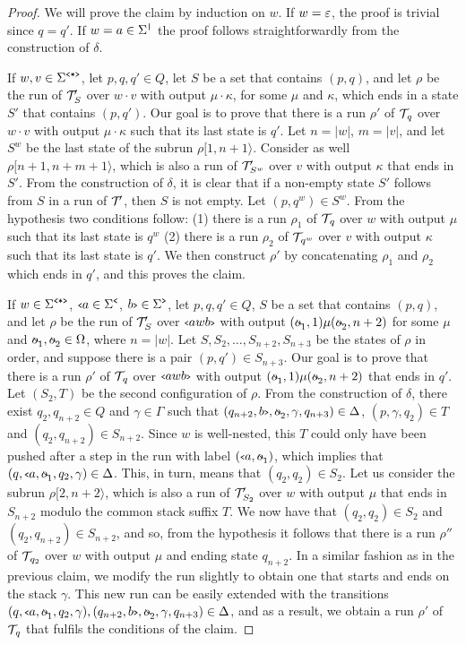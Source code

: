 	\begin{proof}
		We will prove the claim by induction on $w$.
		If $w = \varepsilon$, the proof is trivial since $q = q'$. If $w = a\in\Sigma^{\texttt{|}}$ the proof follows straightforwardly from the construction of $\delta$.
		
		If $w,v\in\Sigma^{\texttt{<*>}}$, let $p,q,q'\in Q$, let $S$ be a set that contains $(p,q)$, and let $\rho$ be the run of $\mathcal{T}\!'_S$ over $w\cdot v$ with output $\mu\cdot \kappa$, for some $\mu$ and $\kappa$, which ends in a state $S'$ that contains $(p,q')$. 
		Our goal is to prove that there is a run $\rho'$ of $\mathcal{T}\!_q$ over $w\cdot v$ with output $\mu\cdot\kappa$ such that its last state is $q'$.
		Let $n = \vert w\vert$, $m = \vert v \vert$, and let $S^w$ be the last state of the subrun $\rho[1,n+1\rangle$. 
		Consider as well $\rho[n+1,n+m+1\rangle$, which is also a run of $\mathcal{T}\!'_{S^w}$ over $v$ with output $\kappa$ that ends in $S'$.
		From the construction of $\delta$, it is clear that if a non-empty state $S'$ follows from $S$ in a run of $\mathcal{T}\!'$, then $S$ is not empty.
		Let $(p,q^w)\in S^w$.
		From the hypothesis two conditions follow: 
		(1) there is a run $\rho_1$ of $\mathcal{T}\!_q$ over $w$ with output $\mu$ such that its last state is $q^w$
		(2) there is a run $\rho_2$ of $\mathcal{T}\!_{q^w}$ over $v$ with output $\kappa$ such that its last state is $q'$. 
		We then construct $\rho'$ by concatenating $\rho_1$ and $\rho_2$ which ends in $q'$, and this proves the claim.
		
		If $w\in\Sigma^{\texttt{<*>}}$, ${\scriptsize\texttt{<}} a\in\Sigma^{\texttt{<}}$, $b{\scriptsize\texttt{>}}\in\Sigma^{\texttt{>}}$, let $p,q,q'\in Q$, $S$ be a set that contains $(p,q)$, and let $\rho$ be the run of $\mathcal{T}\!'_S$ over ${\scriptsize\texttt{<}} awb{\scriptsize\texttt{>}}$ with output $(\oout_1, 1)\mu(\oout_2, n+2)$ for some $\mu$ and $\oout_1,\oout_2\in\oalph$, where $n = |w|$. 
		Let $S, S_2, \ldots, S_{n+2}, S_{n+3}$ be the states of $\rho$ in order, and suppose there is a pair $(p,q')\in S_{n+3}$.
		Our goal is to prove that there is a run $\rho'$ of $\mathcal{T}\!_q$ over ${\scriptsize\texttt{<}} awb{\scriptsize\texttt{>}}$ with output $(\oout_1, 1)\mu(\oout_2, n+2)$ that ends in $q'$. 
		Let $(S_2,T)$ be the second configuration of $\rho$.
		From the construction of $\delta$, there exist $q_2,q_{n+2}\in Q$ and $\gamma\in\Gamma$ such that $(q_{n+2},\cl{b},\oout_2,\gamma,q_{n+3})\in\Delta$, $(p,\gamma,q_2)\in T$ and $(q_2,q_{n+2})\in S_{n+2}$.
		Since $w$ is well-nested, this $T$ could only have been pushed after a step in the run with label $(\op{a},\oout_1)$, which implies that $(q,\op{a},\oout_1,q_2,\gamma)\in\Delta$. This, in turn, means that $(q_2,q_2)\in S_2$.
		Let us consider the subrun $\rho[2,n+2\rangle$, which is also a run of $\mathcal{T}\!'_{S_2}$ over $w$ with output $\mu$ that ends in $S_{n+2}$ modulo the common stack suffix $T$.
		We now have that $(q_2,q_2)\in S_2$ and $(q_2,q_{n+2})\in S_{n+2}$, and so, from the hypothesis it follows that there is a run $\rho''$ of $\mathcal{T}\!_{q_2}$ over $w$ with output $\mu$ and ending state $q_{n+2}$.
		In a similar fashion as in the previous claim, we modify the run slightly to obtain one that starts and ends on the stack $\gamma$.
		This new run can be easily extended with the transitions $(q,\op{a},\oout_1,q_2,\gamma),(q_{n+2},\cl{b},\oout_2,\gamma,q_{n+3})\in\Delta$, and as a result, we obtain a run $\rho'$ of $\mathcal{T}\!_q$ that fulfils the conditions of the claim.
	\end{proof}
